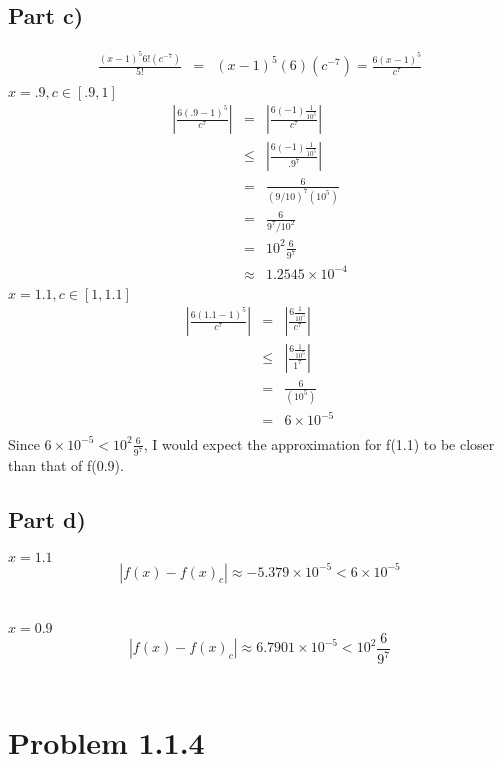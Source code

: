 \documentclass[12pt]{article}
\begin{document}
\subsection*{Part c)}
\begin{eqnarray*}
\frac{(x-1)^{5}6!(c^{-7})}{5!} & = & (x-1)^5(6)(c^{-7}) = \frac{6(x-1)^5}{c^{7}}\\
\end{eqnarray*}
\(x = .9, c \in [.9, 1]\)
\begin{eqnarray*}
\left|\frac{6(.9 - 1)^5}{c^{7}}\right| & = & \left|\frac{6(-1)\frac{1}{10^{5}}}{c^{7}}\right|\\
& \leq & \left|\frac{6(-1)\frac{1}{10^{5}}}{.9^{7}}\right|\\
& = & \frac{6}{(9/10)^{7}(10^{5})}\\
& = & \frac{6}{9^{7}/10^{2}}\\
& = & 10^{2}\frac{6}{9^{7}}\\
& \approx & 1.2545\times10^{-4}\\
\end{eqnarray*}
\(x = 1.1, c \in [1, 1.1]\)
\begin{eqnarray*}
\left|\frac{6(1.1 - 1)^5}{c^{7}}\right| & = & \left|\frac{6\frac{1}{10^{5}}}{c^{7}}\right|\\
& \leq & \left|\frac{6\frac{1}{10^{5}}}{1^{7}}\right|\\
& = & \frac{6}{(10^{5})}\\
& = & 6\times10^{-5}\\
\end{eqnarray*}
Since \(6\times10^{-5} < 10^{2}\frac{6}{9^{7}}\), I would expect the approximation for f(1.1) to be closer than that of f(0.9).\\
\subsection*{Part d)}
\(x = 1.1\)\\
\[\left|f(x)-f(x)_{c}\right| \approx -5.379\times10^{-5} < 6\times10^{-5}\]\\
\\
\(x = 0.9\)\\
\[\left|f(x)-f(x)_{c}\right| \approx 6.7901\times10^{-5} < 10^{2}\frac{6}{9^{7}}\]\\

\section*{Problem 1.1.4}
\end{document}
